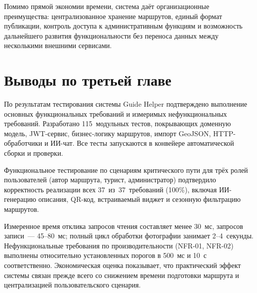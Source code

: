 Помимо прямой экономии времени, система даёт организационные преимущества:
централизованное хранение маршрутов, единый формат публикации, контроль доступа
к административным функциям и возможность дальнейшего развития функциональности
без переноса данных между несколькими внешними сервисами.

\section*{Выводы по третьей главе}

По результатам тестирования системы Guide Helper подтверждено выполнение
основных функциональных требований и измеримых нефункциональных требований.
Разработано 115~модульных тестов, покрывающих доменную модель, JWT-сервис,
бизнес-логику маршрутов, импорт GeoJSON, HTTP-обработчики и ИИ-чат. Все тесты
запускаются в конвейере автоматической сборки и проверки.

Функциональное тестирование по сценариям критического пути для трёх ролей
пользователей (автор маршрута, турист, администратор) подтвердило корректность
реализации всех 37~из~37~требований (100\%), включая ИИ-генерацию описания,
QR-код, встраиваемый виджет и сезонную фильтрацию маршрутов.

Измеренное время отклика запросов чтения составляет менее 30~мс, запросов
записи~--- 45--80~мс; полный цикл обработки фотографии занимает 2--4~секунды.
Нефункциональные требования по производительности (NFR-01, NFR-02) выполнены
относительно установленных порогов в 500~мс и 10~с соответственно. Экономическая
оценка показывает, что практический эффект системы связан прежде всего со
снижением времени подготовки маршрута и централизацией пользовательского
сценария.
